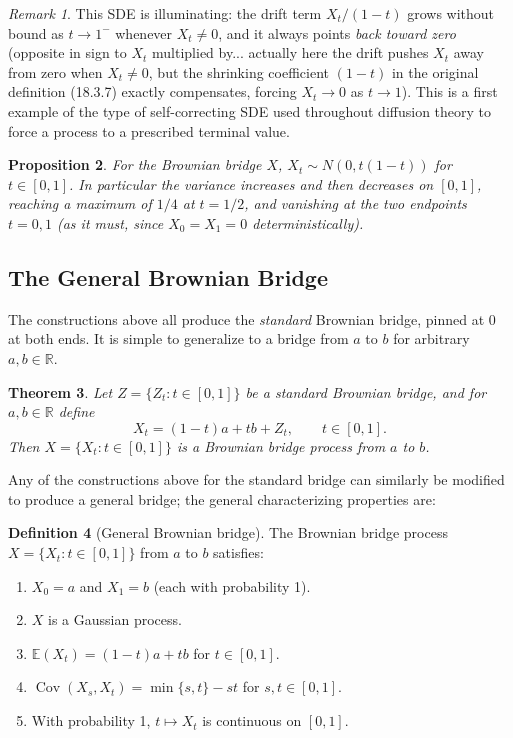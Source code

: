 \documentclass[12pt,openany]{book}
\newtheorem{theorem}{Theorem}[section]
\newtheorem{proposition}[theorem]{Proposition}
\theoremstyle{definition}
\newtheorem{definition}[theorem]{Definition}
\theoremstyle{remark}
\newtheorem{remark}[theorem]{Remark}
\newcommand{\R}{\mathbb{R}}
\newcommand{\E}{\mathbb{E}}
\DeclareMathOperator{\Cov}{Cov}
\begin{document}
\begin{remark}
This SDE is illuminating: the drift term $X_t/(1-t)$ grows without bound as $t \to 1^-$ whenever $X_t \ne 0$, and it always points \emph{back toward zero} (opposite in sign to $X_t$ multiplied by... actually here the drift pushes $X_t$ away from zero when $X_t\ne 0$, but the shrinking coefficient $(1-t)$ in the original definition (18.3.7) exactly compensates, forcing $X_t\to0$ as $t\to1$). This is a first example of the type of self-correcting SDE used throughout diffusion theory to force a process to a prescribed terminal value.
\end{remark}
 
\begin{proposition}
For the Brownian bridge $X$, $X_t \sim N(0, t(1-t))$ for $t\in[0,1]$. In particular the variance increases and then decreases on $[0,1]$, reaching a maximum of $1/4$ at $t=1/2$, and vanishing at the two endpoints $t=0,1$ (as it must, since $X_0=X_1=0$ deterministically).
\end{proposition}
 
\subsection{The General Brownian Bridge}
 
The constructions above all produce the \emph{standard} Brownian bridge, pinned at $0$ at both ends. It is simple to generalize to a bridge from $a$ to $b$ for arbitrary $a,b\in\R$.
 
\begin{theorem}
Let $Z=\{Z_t : t\in[0,1]\}$ be a standard Brownian bridge, and for $a,b\in\R$ define
\[
    X_t = (1-t)a + tb + Z_t, \qquad t\in[0,1].
\]
Then $X=\{X_t : t\in[0,1]\}$ is a \emph{Brownian bridge process from $a$ to $b$}.
\end{theorem}
 
Any of the constructions above for the standard bridge can similarly be modified to produce a general bridge; the general characterizing properties are:
 
\begin{definition}[General Brownian bridge]
The Brownian bridge process $X=\{X_t : t\in[0,1]\}$ from $a$ to $b$ satisfies:
\begin{enumerate}[label=(\arabic*)]
    \item $X_0=a$ and $X_1=b$ (each with probability 1).
    \item $X$ is a Gaussian process.
    \item $\E(X_t) = (1-t)a+tb$ for $t\in[0,1]$.
    \item $\Cov(X_s,X_t) = \min\{s,t\}-st$ for $s,t\in[0,1]$.
    \item With probability 1, $t\mapsto X_t$ is continuous on $[0,1]$.
\end{enumerate}
\end{definition}
 
\end{document}
